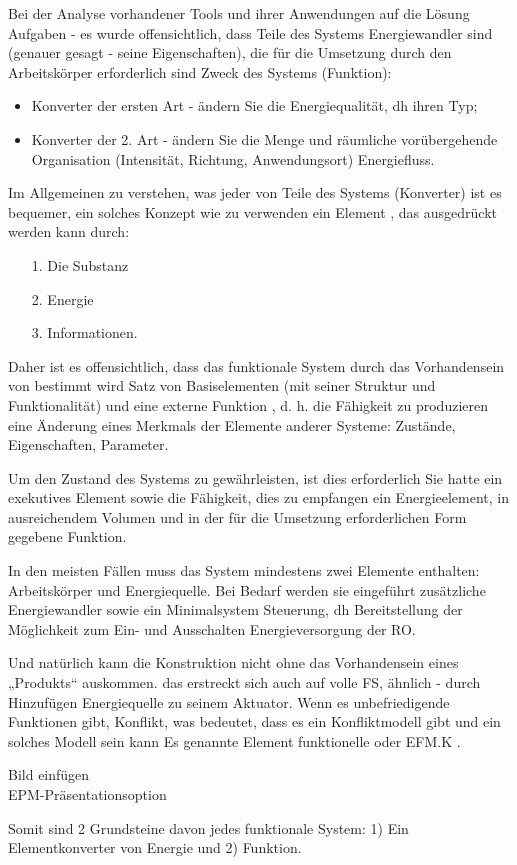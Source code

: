 \documentclass[11pt,a4paper]{article}
\begin{document}
Bei der Analyse vorhandener Tools und ihrer Anwendungen auf die Lösung
Aufgaben - es wurde offensichtlich, dass Teile des Systems Energiewandler sind
(genauer gesagt - seine Eigenschaften), die für die Umsetzung durch den
Arbeitskörper erforderlich sind Zweck des Systems (Funktion):
\begin{itemize}
\item Konverter der ersten Art - ändern Sie die Energiequalität, dh ihren Typ;
\item Konverter der 2. Art - ändern Sie die Menge und räumliche vorübergehende
  Organisation (Intensität, Richtung, Anwendungsort) Energiefluss.
\end{itemize}
Im Allgemeinen zu verstehen, was jeder von Teile des Systems (Konverter) ist
es bequemer, ein solches Konzept wie zu verwenden ein Element , das
ausgedrückt werden kann durch:
\begin{itemize}
\item[1.] Die Substanz
\item[2.] Energie
\item[3.] Informationen.
\end{itemize}
Daher ist es offensichtlich, dass das funktionale System durch das
Vorhandensein von bestimmt wird Satz von Basiselementen (mit seiner Struktur
und Funktionalität) und eine externe Funktion , d. h. die Fähigkeit zu
produzieren eine Änderung eines Merkmals der Elemente anderer Systeme:
Zustände, Eigenschaften, Parameter.

Um den Zustand des Systems zu gewährleisten, ist dies erforderlich Sie hatte
ein exekutives Element sowie die Fähigkeit, dies zu empfangen ein
Energieelement, in ausreichendem Volumen und in der für die Umsetzung
erforderlichen Form gegebene Funktion.

In den meisten Fällen muss das System mindestens zwei Elemente enthalten:
Arbeitskörper und Energiequelle. Bei Bedarf werden sie eingeführt zusätzliche
Energiewandler sowie ein Minimalsystem Steuerung, dh Bereitstellung der
Möglichkeit zum Ein- und Ausschalten Energieversorgung der RO.

Und natürlich kann die Konstruktion nicht ohne das Vorhandensein eines
„Produkts“ auskommen.  das erstreckt sich auch auf volle FS, ähnlich - durch
Hinzufügen Energiequelle zu seinem Aktuator.  Wenn es unbefriedigende
Funktionen gibt, Konflikt, was bedeutet, dass es ein Konfliktmodell gibt und
ein solches Modell sein kann Es genannte Element funktionelle oder EFM.K .

\begin{center}
  Bild einfügen\\ EPM-Präsentationsoption
\end{center}
Somit sind 2 Grundsteine davon jedes funktionale System: 1) Ein
Elementkonverter von Energie und 2) Funktion.
\end{document}
